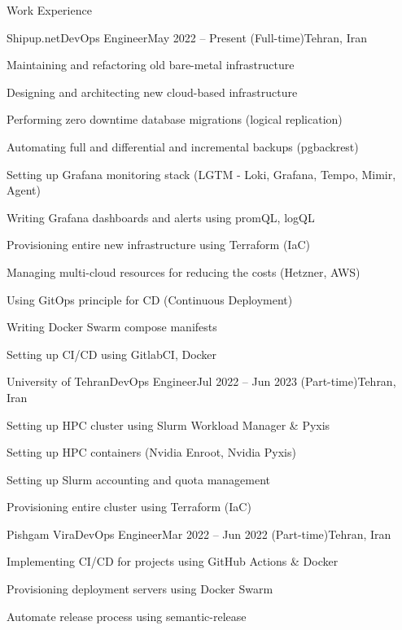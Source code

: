 \documentclass[]{main}
\begin{document}
\begin{section}{Work Experience}
 \begin{subsection}{Shipup.net}{DevOps Engineer}{May 2022 -- Present (Full-time)}{Tehran, Iran}
     \item Maintaining and refactoring old bare-metal infrastructure
     \item Designing and architecting new cloud-based infrastructure
     \item Performing zero downtime database migrations (logical replication)
     \item Automating full and differential and incremental backups (pgbackrest)
     \item Setting up Grafana monitoring stack (LGTM - Loki, Grafana, Tempo, Mimir, Agent)
     \item Writing Grafana dashboards and alerts using promQL, logQL
     \item Provisioning entire new infrastructure using Terraform (IaC)
     \item Managing multi-cloud resources for reducing the costs (Hetzner, AWS)
     \item Using GitOps principle for CD (Continuous Deployment)
     \item Writing Docker Swarm compose manifests
     \item Setting up CI/CD using GitlabCI, Docker
 \end{subsection}
 \begin{subsection}{University of Tehran}{DevOps Engineer}{Jul 2022 -- Jun 2023 (Part-time)}{Tehran, Iran}
     \item Setting up HPC cluster using Slurm Workload Manager \& Pyxis
     \item Setting up HPC containers (Nvidia Enroot, Nvidia Pyxis)
     \item Setting up Slurm accounting and quota management
     \item Provisioning entire cluster using Terraform (IaC)
 \end{subsection}
 \begin{subsection}{Pishgam Vira}{DevOps Engineer}{Mar 2022 -- Jun 2022 (Part-time)}{Tehran, Iran}
     \item Implementing CI/CD for projects using GitHub Actions \& Docker
     \item Provisioning deployment servers using Docker Swarm
     \item Automate release process using semantic-release
 \end{subsection}

\end{section}
\end{document}
